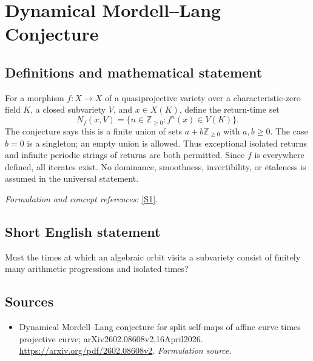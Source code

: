 \documentclass[11pt]{article}
\begin{document}
\section*{\texorpdfstring{Dynamical Mordell–Lang Conjecture}{Dynamical Mordell–Lang Conjecture}}\label{251}
\subsection{Definitions and mathematical statement}
For a morphism $f:X\to X$ of a quasiprojective variety over a characteristic-zero field $K$, a closed subvariety $V$, and $x\in X(K)$, define the return-time set
\[
 N_f(x,V)=\{n\in{\mathbb{Z}}_{\ge0}:f^n(x)\in V(K)\}.
\]
The conjecture says this is a finite union of sets $a+b{\mathbb{Z}}_{\ge0}$ with $a,b\ge0$. The case $b=0$ is a singleton; an empty union is allowed. Thus exceptional isolated returns and infinite periodic strings of returns are both permitted. Since $f$ is everywhere defined, all iterates exist. No dominance, smoothness, invertibility, or \"etaleness is assumed in the universal statement.
\par\smallskip\textit{Formulation and concept references:} \href{https://arxiv.org/pdf/2602.08608v2}{[S1]}.

\subsection{Short English statement}
Must the times at which an algebraic orbit visits a subvariety consist of finitely many arithmetic progressions and isolated times?
\subsection{Sources}
\begin{itemize}
\item[S1]Dynamical Mordell–Lang conjecture for split self-maps of affine curve times projective curve; arXiv2602.08608v2,16April2026.
\url{https://arxiv.org/pdf/2602.08608v2}.
\textit{Formulation source.}
\end{itemize}
\end{document}

